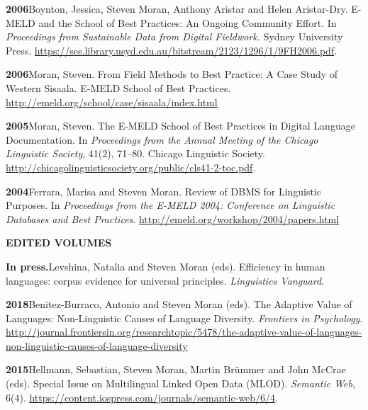 \documentclass[11pt]{article}
\newcommand{\hangpara}{
 \setlength{\parindent}{0in} %
 \hangindent=0.42in %
}
\begin{document}
\vskip 6pt
\hangpara
{\bf 2006}\hspace{1ex}Boynton, Jessica, Steven Moran, Anthony Aristar and Helen Aristar-Dry. E-MELD and the School of Best Practices: An Ongoing Community Effort. In {\it Proceedings from Sustainable Data from Digital Fieldwork.} Sydney University Press. \url{https://ses.library.usyd.edu.au/bitstream/2123/1296/1/9FH2006.pdf}. %

\vskip 6pt
\hangpara
{\bf 2006}\hspace{1ex}Moran, Steven. From Field Methods to Best Practice: A Case Study of Western Sisaala. E-MELD School of Best Practices. \url{http://emeld.org/school/case/sisaala/index.html}

\vskip 6pt
\hangpara
{\bf 2005}\hspace{1ex}Moran, Steven. The E-MELD School of Best Practices in Digital Language Documentation. In {\it Proceedings from the Annual Meeting of the Chicago Linguistic Society}, 41(2), 71--80. Chicago Linguistic Society. \url{http://chicagolinguisticsociety.org/public/cls41-2-toc.pdf}.


\vskip 6pt
\hangpara
{\bf 2004}\hspace{1ex}Ferrara, Marisa and Steven Moran. Review of DBMS for Linguistic Purposes. In {\it Proceedings from the E-MELD 2004: Conference on Linguistic Databases and Best Practices}. \url{http://emeld.org/workshop/2004/papers.html}


\vskip 20pt
\begin{flushleft}
{\bf EDITED VOLUMES}
\end{flushleft}

\hangpara
{\bf In press.}\hspace{1ex}Levshina, Natalia and Steven Moran (eds). Efficiency in human languages: corpus evidence for universal principles. {\it Linguistics Vanguard}.

\hangpara
\vskip 6pt
{\bf 2018}\hspace{1ex}Benitez-Burraco, Antonio and Steven Moran (eds). The Adaptive Value of Languages: Non-Linguistic Causes of Language Diversity. {\it Frontiers in Psychology}. \url{http://journal.frontiersin.org/researchtopic/5478/the-adaptive-value-of-languages-non-linguistic-causes-of-language-diversity}

\hangpara
\vskip 6pt
{\bf 2015}\hspace{1ex}Hellmann, Sebastian, Steven Moran, Martin Brümmer and John McCrae (eds). Special Issue on Multilingual Linked Open Data (MLOD). \textit{Semantic Web}, 6(4). \url{https://content.iospress.com/journals/semantic-web/6/4}.
\end{document}
